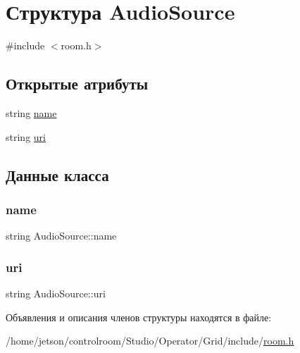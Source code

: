 \hypertarget{struct_audio_source}{}\section{Структура Audio\+Source}
\label{struct_audio_source}


{\ttfamily \#include $<$room.\+h$>$}

\subsection*{Открытые атрибуты}
\begin{DoxyCompactItemize}
\item 
string \hyperlink{struct_audio_source_ab4db8d8ad6e0552f565932b7b3f432ee}{name}
\item 
string \hyperlink{struct_audio_source_a462a95c3122f83138e524f2c26361a1c}{uri}
\end{DoxyCompactItemize}


\subsection{Данные класса}
\mbox{\label{struct_audio_source_ab4db8d8ad6e0552f565932b7b3f432ee}} 
\subsubsection{\texorpdfstring{name}{name}}
{\footnotesize\ttfamily string Audio\+Source\+::name}

\mbox{\label{struct_audio_source_a462a95c3122f83138e524f2c26361a1c}} 
\subsubsection{\texorpdfstring{uri}{uri}}
{\footnotesize\ttfamily string Audio\+Source\+::uri}



Объявления и описания членов структуры находятся в файле\+:\begin{DoxyCompactItemize}
\item 
/home/jetson/controlroom/\+Studio/\+Operator/\+Grid/include/\hyperlink{_operator_2_grid_2include_2room_8h}{room.\+h}\end{DoxyCompactItemize}
